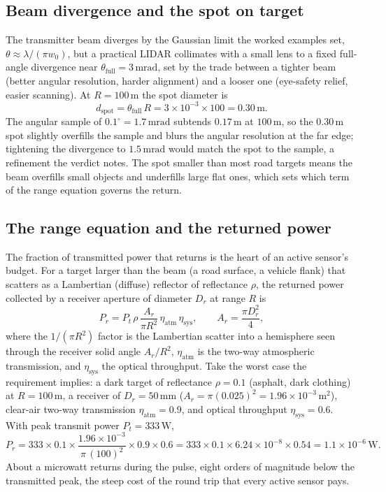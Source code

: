 

\subsection{Beam divergence and the spot on target}

The transmitter beam diverges by the Gaussian limit the worked examples set,
$\theta \approx \lambda/(\pi w_{0})$, but a practical LIDAR collimates with a
small lens to a fixed full-angle divergence near
$\theta_{\text{full}} = 3\,\si{\milli\radian}$, set by the trade between a
tighter beam (better angular resolution, harder alignment) and a looser one
(eye-safety relief, easier scanning). At $R = 100\,\si{\meter}$ the spot
diameter is
\[
d_{\text{spot}} = \theta_{\text{full}}\,R
= 3\times10^{-3}\times 100 = 0.30\,\si{\meter}.
\]
The angular sample of $0.1^{\circ} = 1.7\,\si{\milli\radian}$ subtends
$0.17\,\si{\meter}$ at $100\,\si{\meter}$, so the $0.30\,\si{\meter}$ spot
slightly overfills the sample and blurs the angular resolution at the far edge;
tightening the divergence to $1.5\,\si{\milli\radian}$ would match the spot to
the sample, a refinement the verdict notes. The spot smaller than most road
targets means the beam overfills small objects and underfills large flat ones,
which sets which term of the range equation governs the return.

\subsection{The range equation and the returned power}

The fraction of transmitted power that returns is the heart of an active
sensor's budget. For a target larger than the beam (a road surface, a vehicle
flank) that scatters as a Lambertian (diffuse) reflector of reflectance
$\rho$, the returned power collected by a receiver aperture of diameter
$D_{r}$ at range $R$ is
\[
P_{r} = P_{t}\,\rho\,\frac{A_{r}}{\pi R^{2}}\,\eta_{\text{atm}}\,
\eta_{\text{sys}},
\qquad A_{r} = \frac{\pi D_{r}^{2}}{4},
\]
where the $1/(\pi R^{2})$ factor is the Lambertian scatter into a hemisphere
seen through the receiver solid angle $A_{r}/R^{2}$, $\eta_{\text{atm}}$ is the
two-way atmospheric transmission, and $\eta_{\text{sys}}$ the optical
throughput. Take the worst case the requirement implies: a dark target of
reflectance $\rho = 0.1$ (asphalt, dark clothing) at $R = 100\,\si{\meter}$, a
receiver of $D_{r} = 50\,\si{\milli\meter}$
($A_{r} = \pi(0.025)^{2} = 1.96\times10^{-3}\,\si{\meter\squared}$), clear-air
two-way transmission $\eta_{\text{atm}} = 0.9$, and optical throughput
$\eta_{\text{sys}} = 0.6$. With peak transmit power
$P_{t} = 333\,\si{\watt}$,
\[
P_{r} = 333\times 0.1\times
\frac{1.96\times10^{-3}}{\pi\,(100)^{2}}\times 0.9\times 0.6
= 333\times 0.1\times 6.24\times10^{-8}\times 0.54
= 1.1\times10^{-6}\,\si{\watt}.
\]
About a microwatt returns during the pulse, eight orders of magnitude below
the transmitted peak, the steep cost of the round trip that every active
sensor pays.

